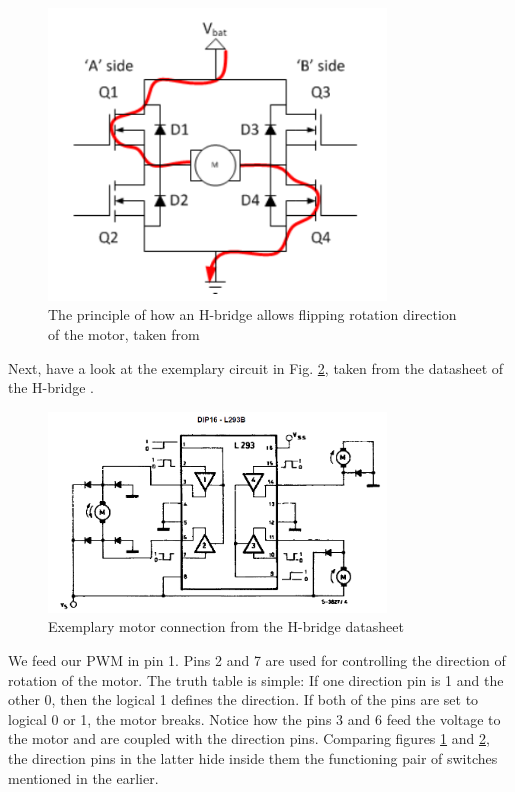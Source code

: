 \begin{figure}[htb]
    \centering
    \includegraphics[width=0.8\textwidth]{figures/hardware/H-Principle.PNG}
    \caption{The principle of how an H-bridge allows flipping rotation direction of the motor, taken from \cite{catchDiodes}}
    \label{fig:HPrinciple}
\end{figure}

\noindent
Next, have a look at the exemplary circuit in Fig. \ref{fig:HData}, taken from the datasheet of the H-bridge \cite{Hbridge}.

\begin{figure}[htb]
    \centering
    \includegraphics[width=0.8\textwidth]{figures/hardware/HbridgeDatasheet.PNG}
    \caption{Exemplary motor connection from the H-bridge datasheet}
    \label{fig:HData}
\end{figure}

\FloatBarrier
\noindent
We feed our PWM in pin 1. Pins 2 and 7 are used for controlling the direction of rotation of the motor. The truth table is simple: If one direction pin is 1 and the other 0, then the logical 1 defines the direction. If both of the pins are set to logical 0 or 1, the motor breaks. Notice how the pins 3 and 6 feed the voltage to the motor and are coupled with the direction pins. Comparing figures \ref{fig:HPrinciple} and \ref{fig:HData}, the direction pins in the latter hide inside them the functioning pair of switches mentioned in the earlier.

